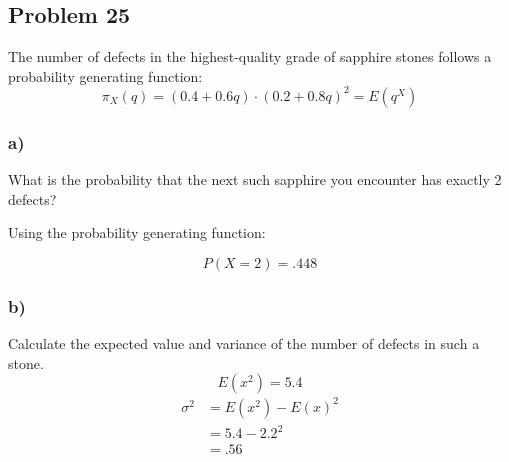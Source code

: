 \documentclass{article}
\begin{document}
\subsection*{Problem 25}
The number of defects in the highest-quality grade of sapphire stones follows a probability generating function:
\begin{equation}
    \pi_X(q) = (0.4+0.6q)\cdot(0.2+0.8q)^2=E(q^X)
\end{equation}
\subsubsection*{a)}
What is the probability that the next such sapphire you encounter has exactly 2 defects?
\begin{center}
    Using the probability generating function:
\end{center}
\begin{equation}
    P(X=2) = .448
\end{equation}
\subsubsection*{b)}
Calculate the expected value and variance of the number of defects in such a stone.
\begin{equation}
    E(x^2) = 5.4
\end{equation}
\begin{align}
    \sigma^2 &= E(x^2) - E(x)^2\\
    &= 5.4 - 2.2^2\\
    &= .56\\
\end{align}
\end{document}
